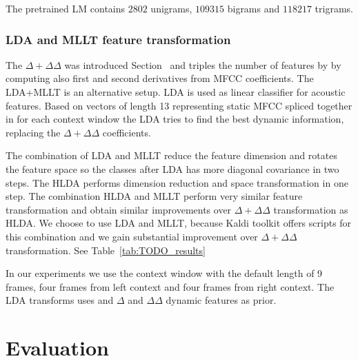 The pretrained \ac{LM} contains $2802$ unigrams, $109315$ bigrams and
$118217$ trigrams. 

\subsubsection*{\acl{LDA} and \ac{MLLT} feature transformation}
The $\Delta + \Delta\Delta$ was introduced Section~\label{sub:param} and triples the number of features by by computing also first and second derivatives from \ac{MFCC} coefficients.
The \ac{LDA}+\ac{MLLT} is an alternative setup.
\ac{LDA} is used as linear classifier for acoustic features.
Based on vectors of length 13 representing static \ac{MFCC} 
spliced together in for each context window the \ac{LDA} tries to 
find the best dynamic information, replacing the $\Delta+\Delta\Delta$ coefficients.

The combination of \ac{LDA} and \ac{MLLT} reduce the feature dimension and
rotates the feature space so the classes after \ac{LDA} has more diagonal covariance in two steps.\cite{gopinath1998maximum}
The \ac{HLDA} performs dimension reduction and space transformation in one step.\cite{gales1999semi}
The combination \ac{HLDA} and \ac{MLLT} perform very similar feature transformation
and obtain similar improvements over $\Delta+\Delta\Delta$ transformation 
as \ac{HLDA}\cite{gales1999semi}\cite{gopinath1998maximum}.
We choose to use \ac{LDA} and \ac{MLLT}, because Kaldi toolkit offers scripts 
for this combination and we gain substantial improvement over $\Delta+\Delta\Delta$ transformation.
See Table~\ref{tab:TODO_results}

In our experiments we use the context window with the default length of 9 frames, 
four frames from left context and four frames from right context.
The \ac{LDA} transforms uses and $\Delta$ and $\Delta\Delta$ dynamic features as prior.



\section{Evaluation}
\label{sec:am_eval}


